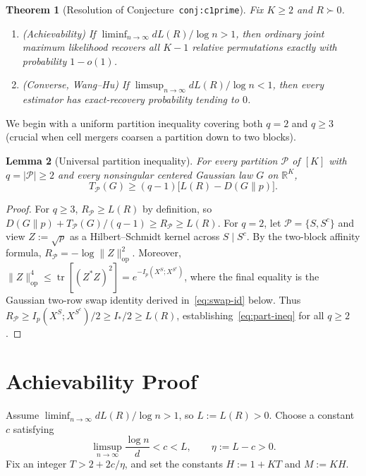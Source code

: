 \documentclass[11pt]{article}
\theoremstyle{plain}
\newtheorem{theorem}{Theorem}
\newtheorem{lemma}[theorem]{Lemma}
\theoremstyle{definition}
\theoremstyle{remark}
\DeclareMathOperator{\tr}{tr}
\begin{document}
\begin{theorem}[Resolution of Conjecture~\texttt{conj:c1prime}]\label{thm:main}
Fix $K \ge 2$ and $R \succ 0$.
\begin{enumerate}[label=\textup{(\arabic*)}]
\item \emph{(Achievability)} If $\liminf_{n \to \infty} d L(R) / \log n > 1$, then ordinary joint maximum likelihood recovers all $K - 1$ relative permutations exactly with probability $1 - o(1)$.
\item \emph{(Converse, Wang--Hu)} If $\limsup_{n \to \infty} d L(R) / \log n < 1$, then every estimator has exact-recovery probability tending to $0$.
\end{enumerate}
\end{theorem}

We begin with a uniform partition inequality covering both $q = 2$ and $q \ge 3$ (crucial when cell mergers coarsen a partition down to two blocks).

\begin{lemma}[Universal partition inequality]\label{lem:part-ineq}
For every partition $\mathcal{P}$ of $[K]$ with $q = |\mathcal{P}| \ge 2$ and every nonsingular centered Gaussian law $G$ on $\mathbb{R}^K$,
\begin{equation}\label{eq:part-ineq}
T_{\mathcal{P}}(G) \ge (q - 1)\bigl[L(R) - D(G \| p)\bigr].
\end{equation}
\end{lemma}

\begin{proof}
For $q \ge 3$, $R_{\mathcal{P}} \ge L(R)$ by definition, so $D(G\|p) + T_{\mathcal{P}}(G)/(q-1) \ge R_{\mathcal{P}} \ge L(R)$.
For $q = 2$, let $\mathcal{P} = \{S, S^c\}$ and view $Z := \sqrt{p}$ as a Hilbert--Schmidt kernel across $S \mid S^c$.
By the two-block affinity formula, $R_{\mathcal{P}} = -\log \|Z\|_{\mathrm{op}}^2$.
Moreover, $\|Z\|_{\mathrm{op}}^4 \le \tr[(Z^* Z)^2] = e^{-I_p(X^S; X^{S^c})}$, where the final equality is the Gaussian two-row swap identity derived in~\eqref{eq:swap-id} below.
Thus $R_{\mathcal{P}} \ge I_p(X^S; X^{S^c})/2 \ge I_*/2 \ge L(R)$, establishing~\eqref{eq:part-ineq} for all $q \ge 2$.
\end{proof}

\section{Achievability Proof}

Assume $\liminf_{n \to \infty} d L(R)/\log n > 1$, so $L := L(R) > 0$.
Choose a constant $c$ satisfying
\[
\limsup_{n \to \infty} \frac{\log n}{d} < c < L, \qquad \eta := L - c > 0.
\]
Fix an integer $T > 2 + 2c/\eta$, and set the constants $H := 1 + KT$ and $M := KH$.
\end{document}
